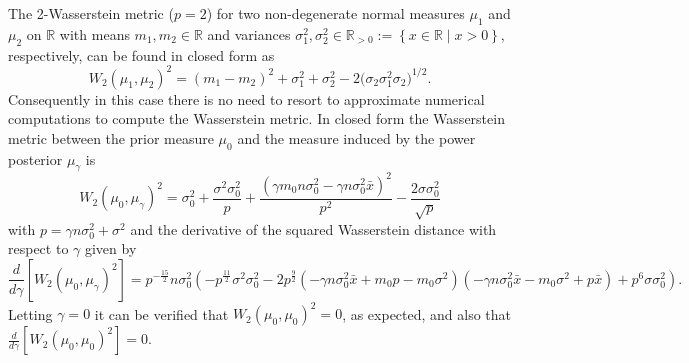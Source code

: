 \documentclass[12pt]{article}
\begin{document}
The 2-Wasserstein metric ($p = 2$) for two non-degenerate normal
measures $\mu_1$ and $\mu_2$ on $\mathbb{R}$ with means $m_1, m_2 \in
\mathbb{R}$ and variances $\sigma_1^2, \sigma_2^2 \in \mathbb{R}_{>0} :=
\left\lbrace x \in \mathbb{R} \; | \; x > 0 \right\rbrace$, respectively, can
be found in closed form as
\begin{equation*}
W_{2} (\mu_1, \mu_2)^2 = \left( m_1 - m_2 \right)^2 + \sigma_1^2 + \sigma_2^2 - 2 \bigl( \sigma_2 \sigma_1^2 \sigma_2 \bigr)^{1/2}.
\end{equation*}
Consequently in this case there is no need to resort to approximate numerical
computations to compute the Wasserstein metric. In closed form the Wasserstein
metric between the prior measure $\mu_0$ and the measure induced by the power posterior
$\mu_\gamma$ is
\begin{equation*}
W_2(\mu_0, \mu_\gamma)^2 = \sigma_{0}^{2} + \frac{\sigma^{2} \sigma_{0}^{2}}{p} + \frac{\left(\gamma m_{0} n \sigma_{0}^{2} - \gamma n \sigma_{0}^{2} \bar{x}\right)^{2}}{p^{2}} - \frac{2 \sigma \sigma_{0}^{2}}{\sqrt{p}}
\end{equation*}
with $p = \gamma n \sigma_{0}^{2} + \sigma^{2}$ and the derivative of the
squared Wasserstein distance with respect to $\gamma$ given by
\tiny
\begin{equation*}
\frac{d}{d\gamma} [W_2(\mu_0, \mu_\gamma)^2] =
p^{-\frac{15}{2}}n \sigma_{0}^{2} \left(- p^{\frac{11}{2}} \sigma^{2} \sigma_{0}^{2} - 2 p^{\frac{9}{2}} \left(- \gamma n \sigma_{0}^{2} \bar{x} + m_{0} p - m_{0} \sigma^{2}\right) \left(- \gamma n \sigma_{0}^{2} \bar{x} - m_{0} \sigma^{2} + p \bar{x}\right) + p^{6} \sigma \sigma_{0}^{2}\right).
\end{equation*}
\normalsize
Letting $\gamma = 0$ it can be verified that $W_2(\mu_0, \mu_0)^2 = 0$, as
expected, and also that $\frac{d}{d\gamma}[W_2(\mu_0, \mu_0)^2] = 0$. 
\end{document}
